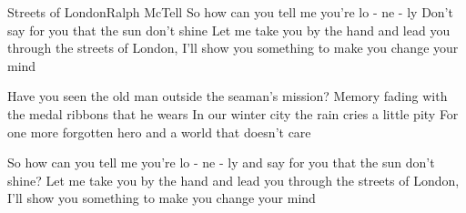 \begin{song}{Streets of London}{Ralph McTell}{}
So how can you tell me you're lo - ne - ly
  Don't say for you that the sun don't shine
Let me take you by the hand and lead you through the streets of London,
  I'll show you something to make you change your mind


Have you seen the old man outside the seaman's mission?
Memory fading with the medal ribbons that he wears
In our winter city the rain cries a little pity
For one more forgotten hero and a world that doesn't care

So how can you tell me you're lo - ne - ly
  and say for you that the sun don't shine?
Let me take you by the hand and lead you through the streets of London,
  I'll show you something to make you change your mind

\end{song}
